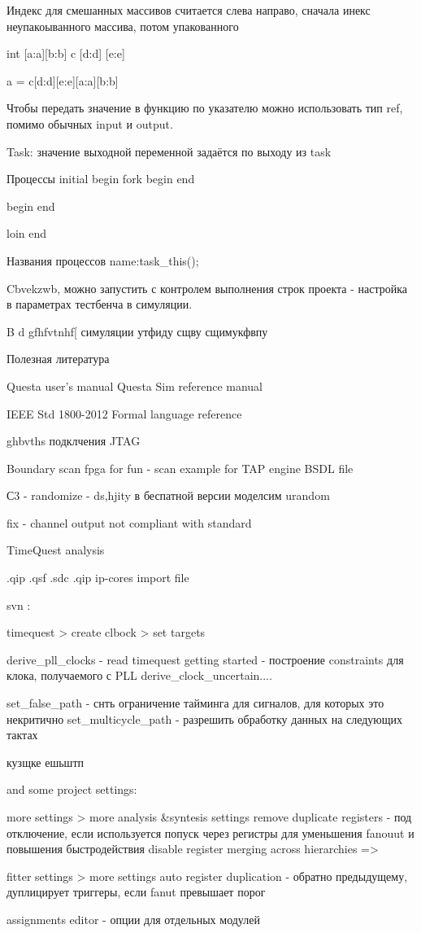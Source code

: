 \documentclass[a4paper, 12pt]{extarticle}
\begin{document}
Индекс для смешанных массивов  считается слева направо, сначала инекс неупакоыванного массива, потом упакованного

int [a:a][b:b] c [d:d] [e:e]

a = c[d:d][e:e][a:a][b:b]

Чтобы передать значение в функцию по указателю можно использовать тип ref, помимо обычных input и output.

Task: значение выходной переменной задаётся по выходу из task


Процессы
initial
	begin
		fork
			begin
			end

			begin
			end

		loin
	end



Названия процессов name:task_this();


Cbvekzwb, можно запустить с контролем выполнения строк проекта - настройка в параметрах тестбенча в симуляции.

B d gfhfvtnhf[ симуляции утфиду сщву сщимукфвпу


Полезная литература

Questa user's manual
Questa Sim reference manual

IEEE Std 1800-2012
Formal language reference


ghbvths подклчения JTAG

Boundary scan
fpga for fun - scan example for TAP engine
BSDL file

С3 - randomize - ds,hjity в беспатной версии моделсим
urandom



fix - channel output not compliant with standard


TimeQuest analysis


.qip
.qsf
.sdc
.qip ip-cores import file


svn :

timequest > create clbock > set targets

derive_pll_clocks - read timequest getting started  -  построение constraints для клока, получаемого с PLL
derive_clock_uncertain....


set_false_path  -  снть ограничение тайминга для сигналов, для которых это некритично
set_multicycle_path - разрешить обработку данных на следующих тактах

кузщке ешьштп

and some project settings:

more settings > more analysis &syntesis settings
	remove duplicate registers - под отключение, если используется попуск через регистры для уменьшения fanouut и повышения быстродействия
	disable register merging across hierarchies =>

fitter settings > more settings
	auto register duplication - обратно предыдущему, дуплицирует триггеры, если fanut превышает порог

	assignments editor - опции для отдельных модулей
\end{document}
